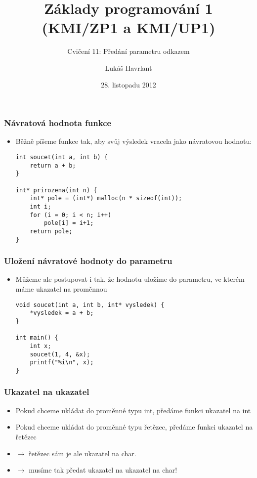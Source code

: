 \documentclass{beamer}
\title{Základy programování 1 (KMI/ZP1 a KMI/UP1)}
\subtitle{Cvičení 11: Předání parametru odkazem}
\author{Lukáš Havrlant}
\date{28. listopadu 2012}
\institute{Univerzita Palackého}
\newenvironment{itemizex}%
  {\large \begin{itemize}%
    \setlength{\itemsep}{8pt}%
    \setlength{\parskip}{8pt}}%
  {\end{itemize}}
\begin{document}
\begin{frame}[t,plain]
\titlepage
\end{frame}


\begin{frame}[t,fragile]\frametitle{Návratová hodnota funkce} 
    \begin{itemizex}
        \item Běžně píšeme funkce tak, aby svůj výsledek vracela jako návratovou hodnotu:
        \begin{verbatim} 
int soucet(int a, int b) {
    return a + b;
}

int* prirozena(int n) {
    int* pole = (int*) malloc(n * sizeof(int));
    int i;
    for (i = 0; i < n; i++) 
        pole[i] = i+1;
    return pole;
}
        \end{verbatim}
    \end{itemizex}
\end{frame}


\begin{frame}[t,fragile]\frametitle{Uložení návratové hodnoty do parametru} 
    \begin{itemizex}
        \item Můžeme ale postupovat i tak, že hodnotu uložíme do parametru, ve kterém máme ukazatel na proměnnou
        \begin{verbatim} 
void soucet(int a, int b, int* vysledek) {
    *vysledek = a + b;
}

int main() {
    int x;
    soucet(1, 4, &x);
    printf("%i\n", x);
}
        \end{verbatim}
    \end{itemizex}
\end{frame}


\begin{frame}[t,fragile]\frametitle{Ukazatel na ukazatel} 
    \begin{itemizex}
        \item Pokud chceme ukládat do proměnné typu int, předáme funkci ukazatel na int
        \item Pokud chceme ukládat do proměnné typu řetězec, předáme funkci ukazatel na řetězec
        \item $\longrightarrow$ řetězec sám je ale ukazatel na char.
        \item $\longrightarrow$ musíme tak předat ukazatel na ukazatel na char!
    \end{itemizex}
\end{frame}
\end{document}
